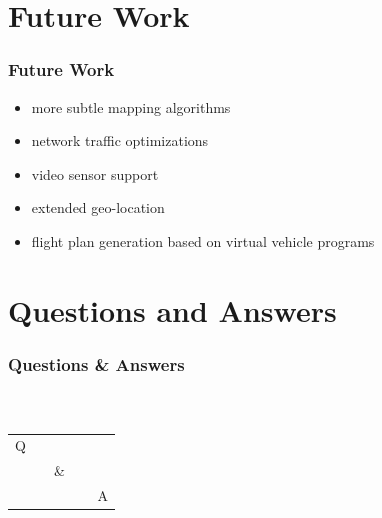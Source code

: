 \documentclass{beamer}
\begin{document}
\section{Future Work}

\begin{frame}\frametitle{Future Work} %
	\begin{itemize}
		\item more subtle mapping algorithms
		\item network traffic optimizations
		\item video sensor support
		\item extended geo-location
		\item flight plan generation based on virtual vehicle programs
	\end{itemize}
\end{frame}
 

\section{Questions and Answers}

\begin{frame}
	\frametitle<presentation>{Questions \& Answers}
	\framesubtitle{~}
	\begin{center}
		\fontsize{64}{64}\selectfont
		\begin{tabular}{ccc}
			Q &&\\
			& ~~\& & \\
			&&~~ A
		\end{tabular}
	\end{center}
\end{frame}
\end{document}

